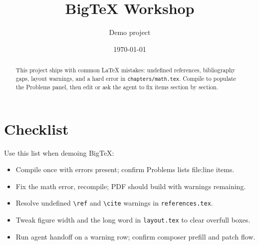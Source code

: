 \documentclass[11pt]{article}
\title{BigTeX Workshop}
\author{Demo project}
\date{\today}
\begin{document}
\maketitle

\begin{abstract}
This project ships with common LaTeX mistakes: undefined references, bibliography gaps,
layout warnings, and a hard error in \texttt{chapters/math.tex}. Compile to populate the
Problems panel, then edit or ask the agent to fix items section by section.
\end{abstract}

\tableofcontents






\section{Checklist}
Use this list when demoing BigTeX:
\begin{itemize}
  \item Compile once with errors present; confirm Problems lists file:line items.
  \item Fix the math error, recompile; PDF should build with warnings remaining.
  \item Resolve undefined \verb|\ref| and \verb|\cite| warnings in \texttt{references.tex}.
  \item Tweak figure width and the long word in \texttt{layout.tex} to clear overfull boxes.
  \item Run agent handoff on a warning row; confirm composer prefill and patch flow.
\end{itemize}
\end{document}
